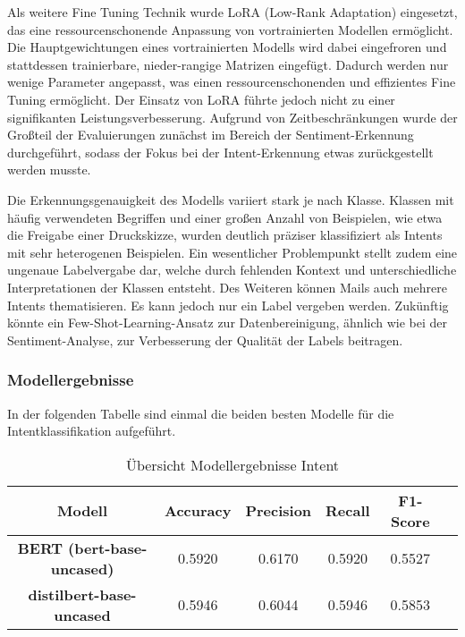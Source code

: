 Als weitere Fine Tuning Technik wurde LoRA (Low-Rank Adaptation) eingesetzt, das eine 
ressourcenschonende Anpassung von vortrainierten Modellen ermöglicht. Die Hauptgewichtungen 
eines vortrainierten Modells wird dabei eingefroren und stattdessen trainierbare, nieder-rangige Matrizen 
eingefügt. Dadurch werden nur wenige Parameter angepasst, was einen ressourcenschonenden und effizientes 
Fine Tuning ermöglicht. Der Einsatz von LoRA führte jedoch nicht zu einer signifikanten 
Leistungsverbesserung. Aufgrund von Zeitbeschränkungen wurde der Großteil der Evaluierungen zunächst 
im Bereich der Sentiment-Erkennung durchgeführt, sodass der Fokus bei der Intent-Erkennung etwas 
zurückgestellt werden musste. 

Die Erkennungsgenauigkeit des Modells variiert stark je nach Klasse. Klassen mit häufig verwendeten 
Begriffen und einer großen Anzahl von Beispielen, wie etwa die Freigabe einer Druckskizze, 
wurden deutlich präziser klassifiziert als Intents mit sehr heterogenen Beispielen. 
Ein wesentlicher Problempunkt stellt zudem eine ungenaue Labelvergabe dar, welche durch 
fehlenden Kontext und unterschiedliche Interpretationen der Klassen entsteht. Des Weiteren können 
Mails auch mehrere Intents thematisieren. Es kann jedoch nur ein Label vergeben werden. 
Zukünftig könnte ein Few-Shot-Learning-Ansatz zur Datenbereinigung, ähnlich wie bei der 
Sentiment-Analyse, zur Verbesserung der Qualität der Labels beitragen. 

\subsubsection{Modellergebnisse}
In der folgenden Tabelle sind einmal die beiden besten Modelle für die Intentklassifikation
aufgeführt. 

\begin{table}[H]
\centering
\begin{tabular}{c|c|c|c|c|c}
            \toprule
             \textbf{Modell} & \textbf{Accuracy} & \textbf{Precision} & \textbf{Recall} & \textbf{F1-Score} \\
             \midrule
             \textbf{BERT (bert-base-uncased)} & 0.5920 & 0.6170 & 0.5920 & 0.5527\\
             \textbf{distilbert-base-uncased} & 0.5946 & 0.6044 & 0.5946 & 0.5853  \\
             \bottomrule
\end{tabular}
\caption{Übersicht Modellergebnisse Intent}
\label{tab:Modellergebnisse Intent}
\end{table}


